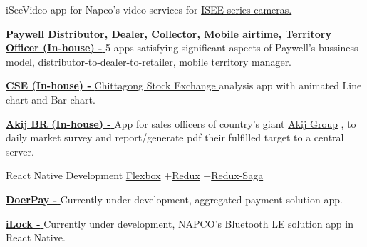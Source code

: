 \begin{projectentries}
{\begin{projectitems}
{        iSeeVideo app for Napco's video services for 
        {\href{http://www.napcosecurity.com/products/isee-ivr250/}{ISEE series cameras.}}}  
        \item {{\href{https://futurestartup.com/2018/03/13/the-evolution-of-cloudwell-clouldwells-strategy-and-ambition-an-interview-with-anisul-islam-founder-and-ceo-cloudwell/}
        {\textbf{Paywell Distributor, Dealer, Collector, Mobile airtime, Territory Officer (In-house) - }}}
        5 apps satisfying significant aspects of Paywell's bussiness model, distributor-to-dealer-to-retailer, mobile territory manager.}  
        \item {{\href{https://drive.google.com/file/d/1AE3tdaTBA1hnKjhM2Quv4poWi6oQthwy/view?usp=sharing}{\textbf{CSE (In-house) - }}}
        {\href{https://www.cse.com.bd/}{Chittagong Stock Exchange }}
        analysis app with animated Line chart and Bar chart.}  
        \item {{\href{https://www.akij.net/}{\textbf{Akij BR (In-house) - }}}
        App for sales officers of country's giant 
        {\href{https://www.akij.net}{Akij Group}}
        , to daily market survey and report/generate pdf their fulfilled target to a central server.}  
      \end{projectitems}
    }
    

    \projectentry 
    {React Native Development} 
    {{\href{https://css-tricks.com/snippets/css/a-guide-to-flexbox/}{Flexbox}}
    +{\href{https://redux.js.org/basics/usagewithreact}{Redux}}
    +{\href{https://redux.js.org/basics/usagewithreact}{Redux-Saga}}}
    {
      \begin{projectitems} %
        \item {{\href{http://doer.com.bd}{\textbf{DoerPay - }}}
        Currently under development, aggregated payment solution app.}
        \item {{\href{http://www.alarmlock.com/news/architech-bluetooth/}{\textbf{iLock - }}}
        Currently under development, NAPCO's Bluetooth LE solution app in React Native.}  
      \end{projectitems}
    }
\end{projectentries}
